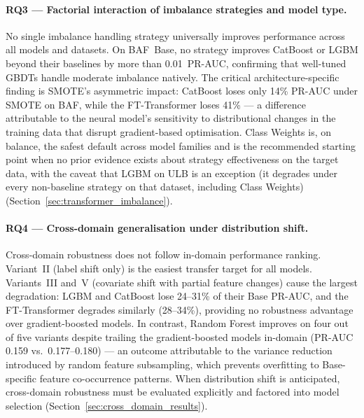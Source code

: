 \paragraph{RQ3 — Factorial interaction of imbalance strategies and model type.}
No single imbalance handling strategy universally improves performance across all models and datasets. On BAF~Base, no strategy improves CatBoost or LGBM beyond their baselines by more than 0.01~PR-AUC, confirming that well-tuned GBDTs handle moderate imbalance natively. The critical architecture-specific finding is SMOTE's asymmetric impact: CatBoost loses only 14\% PR-AUC under SMOTE on BAF, while the FT-Transformer loses 41\% — a difference attributable to the neural model's sensitivity to distributional changes in the training data that disrupt gradient-based optimisation. Class Weights is, on balance, the safest default across model families and is the recommended starting point when no prior evidence exists about strategy effectiveness on the target data, with the caveat that LGBM on ULB is an exception (it degrades under every non-baseline strategy on that dataset, including Class Weights) (Section~\ref{sec:transformer_imbalance}).

\paragraph{RQ4 — Cross-domain generalisation under distribution shift.}
Cross-domain robustness does not follow in-domain performance ranking. Variant~II (label shift only) is the easiest transfer target for all models. Variants~III and~V (covariate shift with partial feature changes) cause the largest degradation: LGBM and CatBoost lose 24--31\% of their Base PR-AUC, and the FT-Transformer degrades similarly (28--34\%), providing no robustness advantage over gradient-boosted models. In contrast, Random Forest improves on four out of five variants despite trailing the gradient-boosted models in-domain (PR-AUC 0.159 vs.\ 0.177--0.180) — an outcome attributable to the variance reduction introduced by random feature subsampling, which prevents overfitting to Base-specific feature co-occurrence patterns. When distribution shift is anticipated, cross-domain robustness must be evaluated explicitly and factored into model selection (Section~\ref{sec:cross_domain_results}).


